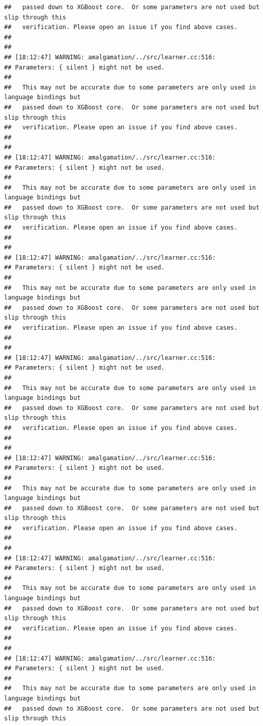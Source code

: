 \documentclass[AMS,STIX2COL]{WileyNJD-v2}\usepackage[]{graphicx}\usepackage[]{color}
\makeatletter
\newenvironment{kframe}{%
 \def\at@end@of@kframe{}%
 \ifinner\ifhmode%
  \def\at@end@of@kframe{\end{minipage}}%
  \begin{minipage}{\columnwidth}%
 \fi\fi%
 \def\FrameCommand##1{\hskip\@totalleftmargin \hskip-\fboxsep
 \colorbox{shadecolor}{##1}\hskip-\fboxsep
     \hskip-\linewidth \hskip-\@totalleftmargin \hskip\columnwidth}%
 \MakeFramed {\advance\hsize-\width
   \@totalleftmargin\z@ \linewidth\hsize
   \@setminipage}}%
 {\par\unskip\endMakeFramed%
 \at@end@of@kframe}
\newenvironment{knitrout}{}{} %
\makeatother
\begin{document}
\begin{knitrout}
\begin{kframe}
\begin{verbatim}
##   passed down to XGBoost core.  Or some parameters are not used but slip through this
##   verification. Please open an issue if you find above cases.
## 
## 
## [18:12:47] WARNING: amalgamation/../src/learner.cc:516: 
## Parameters: { silent } might not be used.
## 
##   This may not be accurate due to some parameters are only used in language bindings but
##   passed down to XGBoost core.  Or some parameters are not used but slip through this
##   verification. Please open an issue if you find above cases.
## 
## 
## [18:12:47] WARNING: amalgamation/../src/learner.cc:516: 
## Parameters: { silent } might not be used.
## 
##   This may not be accurate due to some parameters are only used in language bindings but
##   passed down to XGBoost core.  Or some parameters are not used but slip through this
##   verification. Please open an issue if you find above cases.
## 
## 
## [18:12:47] WARNING: amalgamation/../src/learner.cc:516: 
## Parameters: { silent } might not be used.
## 
##   This may not be accurate due to some parameters are only used in language bindings but
##   passed down to XGBoost core.  Or some parameters are not used but slip through this
##   verification. Please open an issue if you find above cases.
## 
## 
## [18:12:47] WARNING: amalgamation/../src/learner.cc:516: 
## Parameters: { silent } might not be used.
## 
##   This may not be accurate due to some parameters are only used in language bindings but
##   passed down to XGBoost core.  Or some parameters are not used but slip through this
##   verification. Please open an issue if you find above cases.
## 
## 
## [18:12:47] WARNING: amalgamation/../src/learner.cc:516: 
## Parameters: { silent } might not be used.
## 
##   This may not be accurate due to some parameters are only used in language bindings but
##   passed down to XGBoost core.  Or some parameters are not used but slip through this
##   verification. Please open an issue if you find above cases.
## 
## 
## [18:12:47] WARNING: amalgamation/../src/learner.cc:516: 
## Parameters: { silent } might not be used.
## 
##   This may not be accurate due to some parameters are only used in language bindings but
##   passed down to XGBoost core.  Or some parameters are not used but slip through this
##   verification. Please open an issue if you find above cases.
## 
## 
## [18:12:47] WARNING: amalgamation/../src/learner.cc:516: 
## Parameters: { silent } might not be used.
## 
##   This may not be accurate due to some parameters are only used in language bindings but
##   passed down to XGBoost core.  Or some parameters are not used but slip through this

\end{verbatim}
\end{kframe}
\end{knitrout}
\end{document}
